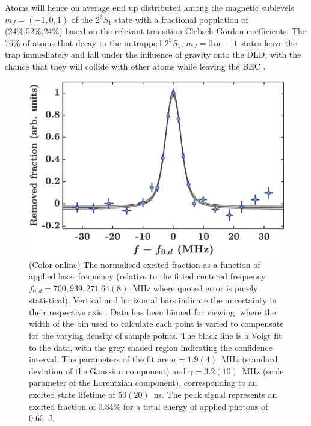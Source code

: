 \documentclass[%
 reprint,
 amsmath,amssymb,
 aps,
 prl,
]{revtex4-2}
\newcommand{\MetastableState}{2^{3\!}S_1}%
\begin{document}
Atoms will hence on average end up distributed among the magnetic sublevels \(m_J=(-1,0, 1)\) of the \(\MetastableState\) state with a fractional population of (24\%,52\%,24\%) based on the relevant transition Clebsch-Gordan coefficients. 
The 76\% of atoms that decay to the untrapped \(\MetastableState, \, m_J=0\, \text{or} \, -1\) states leave the trap immediately and fall under the influence of gravity onto the DLD, with the chance that they will collide with other atoms while leaving the BEC \cite{SOMs}. %
\begin{figure}[b]
\centering
\includegraphics[width=\linewidth]{direct_scan_voigt_full_v4}
\caption{(Color online) The normalised excited fraction as a function of applied laser frequency (relative to the fitted centered frequency \(f_{0,d} = 700,939,271.64(8)\)~MHz where quoted error is purely statistical). Vertical and horizontal bars indicate the uncertainty in their respective axis \cite{standard_error_note}. Data has been binned for viewing, where the width of the bin used to calculate each point is varied to compensate for the varying density of sample points. The black line is a Voigt fit to the data, with the grey shaded region indicating the confidence interval.  The parameters of the fit are \(\sigma=1.9(4)\)~MHz (standard deviation of the Gaussian component) and \(\gamma=3.2(10)\)~MHz (scale parameter of the Lorentzian component), corresponding to an excited state lifetime of \(50(20)\)~ns. The peak signal represents an excited fraction of 0.34\% for a total energy of applied photons of \(0.65\)~J.
}
\label{fig:427nm_signal}
\end{figure}
\end{document}
